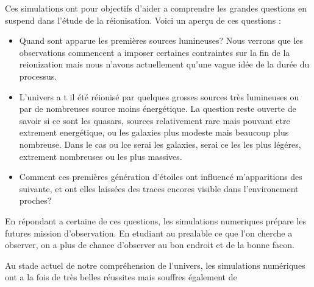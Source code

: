 Ces simulations ont pour objectifs d'aider a comprendre les grandes questions en suspend dans l'étude de la réionisation.
Voici un aperçu de ces questions : 

\begin{itemize}
\item Quand sont apparue les premières sources lumineuses?
Nous verrons que les observations commencent a imposer certaines contraintes sur la fin de la reionization mais  nous n'avons actuellement qu'une vague idée de la durée du processus.

\item L'univers a t il été réionisé par quelques grosses sources très lumineuses ou par de nombreuses source moins énergétique.
La question reste ouverte de savoir si ce sont les quasars, sources relativement rare mais pouvant etre extrement energétique, ou les galaxies plus modeste mais beaucoup plus nombreuse.
Dans le cas ou lce serai les galaxies, serai ce les les plus légéres, extrement nombreuses ou les plus massives.

\item Comment ces premières génération d'étoiles ont influencé m'apparitions des suivante, et ont elles laissées des traces encores visible dans l'environement proches?

\end{itemize} 

En répondant a certaine de ces questions, les simulations numeriques prépare les futures mission d'observation.
En etudiant au prealable ce que l'on cherche a  observer, on a plus de chance d'observer au bon endroit et de la bonne facon.


Au stade actuel de notre compréhension de l'univers, les simulations numériques ont a la fois de très belles réussites mais souffres également de 

